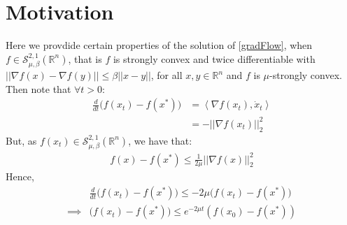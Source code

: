 \section{Motivation}
Here we provdide certain properties of the solution of \eqref{gradFlow}, when $f \in \mathcal{S}^{2,1}_{\mu,\beta}(\mathbb{R}^n)$, that is $f$ is strongly convex and twice differentiable with $|| \nabla f(x) - \nabla f(y) || \leq \beta ||x - y||$, for all $x,y \in \mathbb{R}^n$ and $f$ is $\mu$-strongly convex. Then note that $\forall t >0$:
\begin{equation}
\begin{aligned}
\frac{d}{dt}\big(f(x_t) - f(x^*) \big) &= \left\langle \nabla f(x_t), \dot{x}_t \right\rangle \\
& = - ||\nabla f(x_t)||_2^2
\end{aligned}
\end{equation}
But, as $f(x_t)\in \mathcal{S}^{2,1}_{\mu,\beta}(\mathbb{R}^n)$, we have that:
\begin{equation}
\begin{aligned}
f(x) - f(x^*) \leq \frac{1}{2\mu}|| \nabla f(x)||_2^2
\end{aligned}
\end{equation}
Hence,
\begin{equation}
\begin{aligned}
& \frac{d}{dt} \big(f(x_t) - f(x^*) \big) \leq -2\mu \big(f(x_t) - f(x^*)\big) \\
\implies &  \big(f(x_t) - f(x^*) \big) \leq e^{-2\mu t}(f(x_0) - f(x^*))
\end{aligned}
\end{equation}

